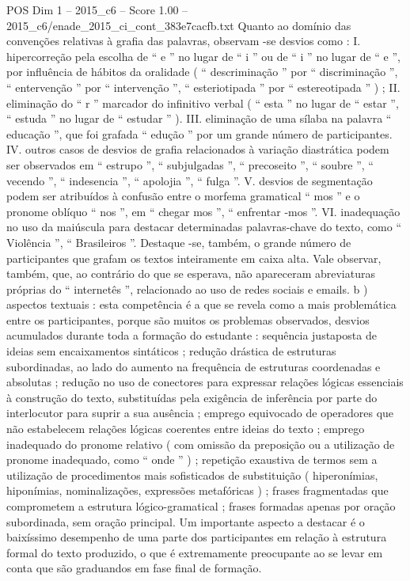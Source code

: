 \begin{textsample}{POS Dim 1 – 2015\_c6 – Score 1.00 – 2015\_c6/enade\_2015\_ci\_cont\_383e7cacfb.txt}
Quanto ao domínio das convenções relativas à grafia das palavras, observam -se desvios como : I. hipercorreção pela escolha de “ e ” no lugar de “ i ” ou de “ i ” no lugar de “ e ”, por influência de hábitos da oralidade ( “ descriminação ” por “ discriminação ”, “ entervenção ” por “ intervenção ”, “ esteriotipada ” por “ estereotipada ” ) ; II. eliminação do “ r ” marcador do infinitivo verbal ( “ esta ” no lugar de “ estar ”, “ estuda ” no lugar de “ estudar ” ).
III. eliminação de uma sílaba na palavra “ educação ”, que foi grafada “ edução ” por um grande número de participantes.
IV. outros casos de desvios de grafia relacionados à variação diastrática podem ser observados em “ estrupo ”, “ subjulgadas ”, “ precoseito ”, “ soubre ”, “ vecendo ”, “ indesencia ”, “ apolojia ”, “ fulga ”.
V. desvios de segmentação podem ser atribuídos à confusão entre o morfema gramatical “ mos ” e o pronome oblíquo “ nos ”, em “ chegar mos ”, “ enfrentar -mos ”.
VI. inadequação no uso da maiúscula para destacar determinadas palavras-chave do texto, como “ Violência ”, “ Brasileiros ”.
Destaque -se, também, o grande número de participantes que grafam os textos inteiramente em caixa alta.
Vale observar, também, que, ao contrário do que se esperava, não apareceram abreviaturas próprias do “ internetês ”, relacionado ao uso de redes sociais e emails. b ) aspectos textuais : esta competência é a que se revela como a mais problemática entre os participantes, porque são muitos os problemas observados, desvios acumulados durante toda a formação do estudante : sequência justaposta de ideias sem encaixamentos sintáticos ; redução drástica de estruturas subordinadas, ao lado do aumento na frequência de estruturas coordenadas e absolutas ; redução no uso de conectores para expressar relações lógicas essenciais à construção do texto, substituídas pela exigência de inferência por parte do interlocutor para suprir a sua ausência ; emprego equivocado de operadores que não estabelecem relações lógicas coerentes entre ideias do texto ; emprego inadequado do pronome relativo ( com omissão da preposição ou a utilização de pronome inadequado, como “ onde ” ) ; repetição exaustiva de termos sem a utilização de procedimentos mais sofisticados de substituição ( hiperonímias, hiponímias, nominalizações, expressões metafóricas ) ; frases fragmentadas que comprometem a estrutura lógico-gramatical ; frases formadas apenas por oração subordinada, sem oração principal.
Um importante aspecto a destacar é o baixíssimo desempenho de uma parte dos participantes em relação à estrutura formal do texto produzido, o que é extremamente preocupante ao se levar em conta que são graduandos em fase final de formação.

\end{textsample}
